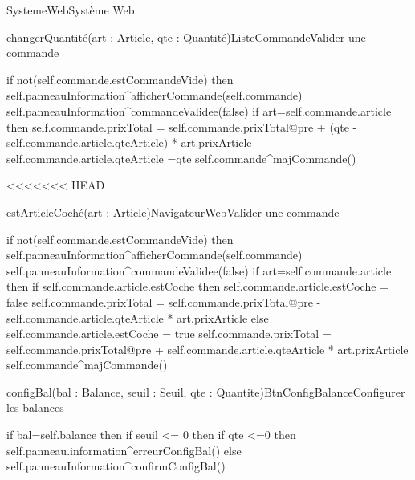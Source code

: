 \begin{OM}{SystemeWeb}{Système Web}
    \begin{OMOperation}{changerQuantité(art : Article, qte : Quantité)}{ListeCommande}{Valider une commande}
        \begin{OMMessages}
        \end{OMMessages}
        \OMNoPre
        \begin{OMPost}
            if not(self.commande.estCommandeVide) then
            self.panneauInformation^afficherCommande(self.commande)
            self.panneauInformation^commandeValidee(false)
            if art=self.commande.article then
            self.commande.prixTotal = self.commande.prixTotal@pre + (qte -
            self.commande.article.qteArticle) * art.prixArticle
            self.commande.article.qteArticle =qte
            self.commande^majCommande()
        \end{OMPost}
    \end{OMOperation}

<<<<<<< HEAD
    \begin{OMOperation}{estArticleCoché(art : Article)}{NavigateurWeb}{Valider une commande}
        \begin{OMMessages}
        \end{OMMessages}
        \OMNoPre
        \begin{OMPost}
            if not(self.commande.estCommandeVide) then
            self.panneauInformation^afficherCommande(self.commande)
            self.panneauInformation^commandeValidee(false)
            if art=self.commande.article then
            if self.commande.article.estCoche then
            self.commande.article.estCoche = false
            self.commande.prixTotal = self.commande.prixTotal@pre -
            self.commande.article.qteArticle * art.prixArticle
            else
            self.commande.article.estCoche = true
            self.commande.prixTotal = self.commande.prixTotal@pre +
            self.commande.article.qteArticle * art.prixArticle
            self.commande^majCommande()
        \end{OMPost}
    \end{OMOperation}

    \begin{OMOperation}{configBal(bal : Balance, seuil : Seuil, qte : Quantite)}{BtnConfigBalance}{Configurer les balances}
        \begin{OMMessages}
        \end{OMMessages}
        \OMNoPre
        \begin{OMPost}
            if bal=self.balance then
            if seuil <= 0 then
            if qte <=0 then
            self.panneau.information^erreurConfigBal()
            else
            self.panneauInformation^confirmConfigBal()
        \end{OMPost}
    \end{OMOperation}


\end{OM}
